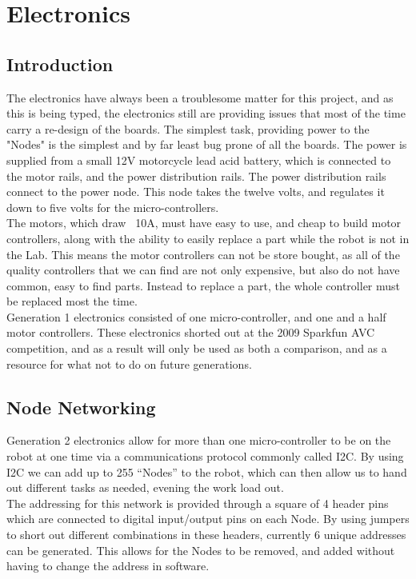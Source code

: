 \documentclass{article}
\begin{document}
\section{Electronics}
\subsection{Introduction}
The electronics have always been a troublesome matter for this project, and as this is being typed, the electronics still are providing issues that most of the time carry a re-design of the boards. The simplest task, providing power to the "Nodes" is the simplest and by far least bug prone of all the boards. The power is supplied from a small 12V motorcycle lead acid battery, which is connected to the motor rails, and the power distribution rails. The power distribution rails connect to the power node. This node takes the twelve volts, and regulates it down to five volts for the micro-controllers.\\
The motors, which draw ~10A, must have easy to use, and cheap to build motor controllers, along with the ability to easily replace a part while the robot is not in the Lab. This means the motor controllers can not be store bought, as all of the quality controllers that we can find are not only expensive, but also do not have common, easy to find parts. Instead to replace a part, the whole controller must be replaced most the time.\\
Generation 1 electronics consisted of one micro-controller, and one and a half motor controllers. These electronics shorted out at the 2009 Sparkfun AVC competition, and as a result will only be used as both a comparison, and as a resource for what not to do on future generations.\\
\subsection{Node Networking}
Generation 2 electronics allow for more than one micro-controller to be on the robot at one time via a communications protocol commonly called I2C. By using I2C we can add up to 255 “Nodes” to the robot, which can then allow us to hand out different tasks as needed, evening the work load out.\\
The addressing for this network is provided through a square of 4 header pins which are connected to digital input/output pins on each Node. By using jumpers to short out different combinations in these headers, currently 6 unique addresses can be generated. This allows for the Nodes to be removed, and added without having to change the address in software.\\
\end{document}
